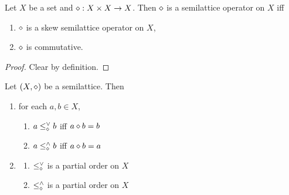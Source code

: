 \documentclass{book}
\begin{document}
	\begin{ex} 
		Let $X$ be a set and $\diamond:X \times X \rightarrow X$. 
		Then $\diamond$ is a semilattice operator on $X$ iff 
		\begin{enumerate}
			\item $\diamond$ is a skew semilattice operator on $X$, \item $\diamond$ is commutative.
		\end{enumerate}
	\end{ex}
	
	\begin{proof}
		Clear by definition. 
	\end{proof}
	
	\begin{ex} 
		Let $(X, \diamond)$ be a semilattice. Then 
		\begin{enumerate}
			\item for each $a, b \in X$,
			\begin{enumerate}
				\item $a \leq^{\vee}_{\diamond} b$ iff $a \diamond b = b$
				\item $a \leq^{\wedge}_{\diamond} b$ iff $a \diamond b = a$
			\end{enumerate}
			\item 
			\begin{enumerate}
				\item $\leq^{\vee}_{\diamond}$ is a partial order on $X$
				\item $\leq^{\wedge}_{\diamond}$ is a partial order on $X$
			\end{enumerate}
		\end{enumerate}
	\end{ex}
	
\end{document}
